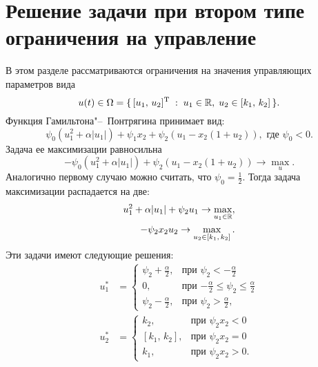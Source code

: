 \section{Решение задачи при втором типе ограничения на управление}

В этом разделе рассматриваются ограничения на значения управляющих параметров вида
$$
        u(t) \in \Omega = \{\,[u_1,\,u_2]^{\mathrm{T}}\;:\; u_1 \in \mathbb{R},\; u_2\in[k_1,\,k_2]\,\}.
$$
Функция Гамильтона"--~Понтрягина принимает вид:
$$
        \psi_0(u_1^2 + \alpha|u_1|) + \psi_1 x_2 + \psi_2(u_1 - x_2(1 + u_2)), \mbox{ где $\psi_0 < 0$}.
$$
Задача ее максимизации равносильна
$$
        -\psi_0(u_1^2 + \alpha|u_1|) + \psi_2(u_1 - x_2(1+u_2)) \to \max\limits_{u}.
$$
Аналогично первому случаю можно считать, что $\psi_0 = \frac{1}{2}$. Тогда задача максимизации распадается на две:
$$
\begin{aligned}
        u_1^2 + \alpha|u_1| + \psi_2 u_1 \to \max\limits_{u_1\in\mathbb{R}}, \\
        -\psi_2 x_2 u_2 \to \max\limits_{u_2\in[k_1,\,k_2]}.
\end{aligned}
$$
Эти задачи имеют следующие решения:
$$
\begin{aligned}
        u_1^* &= 
        \begin{cases}
                \psi_2 + \frac{\alpha}{2}, &\mbox{при $\psi_2 < -\frac{\alpha}{2}$}\\
                0, &\mbox{при $-\frac{\alpha}{2} \leqslant \psi_2 \leqslant \frac{\alpha}{2}$}\\
                \psi_2 - \frac{\alpha}{2}, &\mbox{при $\psi_2 > \frac{\alpha}{2}$},
        \end{cases}
        \\
        u_2^* &=
        \begin{cases}
                k_2, &\mbox{при $\psi_2 x_2 < 0$}\\
                [k_1,\,k_2], &\mbox{при $\psi_2 x_2 = 0$}\\
                k_1, &\mbox{при $\psi_2 x_2 > 0$}.
        \end{cases}
\end{aligned}
$$

